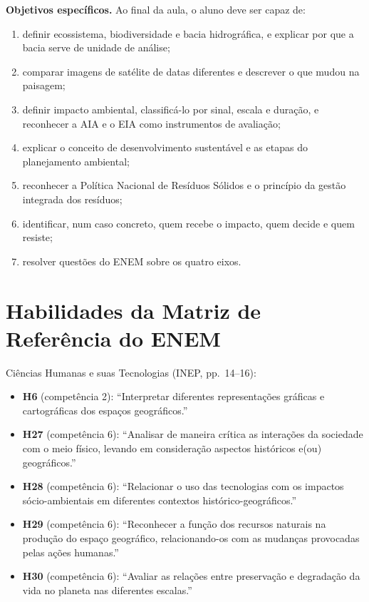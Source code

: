 \documentclass[11pt]{article}
\begin{document}
\textbf{Objetivos específicos.} Ao final da aula, o aluno deve ser capaz de:
\begin{enumerate}
  \item definir ecossistema, biodiversidade e bacia hidrográfica, e explicar por que a bacia serve de unidade de análise;
  \item comparar imagens de satélite de datas diferentes e descrever o que mudou na paisagem;
  \item definir impacto ambiental, classificá-lo por sinal, escala e duração, e reconhecer a AIA e o EIA como instrumentos de avaliação;
  \item explicar o conceito de desenvolvimento sustentável e as etapas do planejamento ambiental;
  \item reconhecer a Política Nacional de Resíduos Sólidos e o princípio da gestão integrada dos resíduos;
  \item identificar, num caso concreto, quem recebe o impacto, quem decide e quem resiste;
  \item resolver questões do ENEM sobre os quatro eixos.
\end{enumerate}

\section{Habilidades da Matriz de Referência do ENEM}
Ciências Humanas e suas Tecnologias (INEP, pp.~14--16):
\begin{itemize}
  \item \textbf{H6} (competência 2): \enquote{Interpretar diferentes representações gráficas e cartográficas dos
    espaços geográficos.}
  \item \textbf{H27} (competência 6): \enquote{Analisar de maneira crítica as interações da sociedade com o meio
    físico, levando em consideração aspectos históricos e(ou) geográficos.}
  \item \textbf{H28} (competência 6): \enquote{Relacionar o uso das tecnologias com os impactos sócio-ambientais
    em diferentes contextos histórico-geográficos.}
  \item \textbf{H29} (competência 6): \enquote{Reconhecer a função dos recursos naturais na produção do espaço
    geográfico, relacionando-os com as mudanças provocadas pelas ações humanas.}
  \item \textbf{H30} (competência 6): \enquote{Avaliar as relações entre preservação e degradação da vida no
    planeta nas diferentes escalas.}
\end{itemize}
\end{document}
